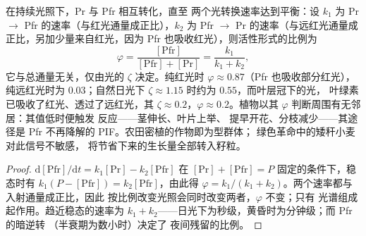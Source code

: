 \begin{proposition}[光敏色素光平衡]\label{prop:b3:plant-molecular-physiology:photoequilibrium}
在持续光照下，Pr 与 Pfr 相互转化，直至
两个光转换速率达到平衡：设 $k_{1}$ 为 Pr $\to$ Pfr
的速率（与红光通量成正比），$k_{2}$ 为 Pfr $\to$ Pr
的速率（与远红光通量成正比，另加少量来自红光，因为
Pfr 也吸收红光），则活性形式的比例为
\[
\varphi = \frac{[\text{Pfr}]}{[\text{Pfr}] + [\text{Pr}]} = \frac{k_{1}}{k_{1} + k_{2}},
\]
它与总通量无关，仅由光的\emph{}
$\zeta$ 决定。纯红光时 $\varphi \approx 0.87$（Pfr
也吸收部分红光），纯远红光时为 $0.03$；自然日光下 $\zeta \approx
1.15$ 时约为 $0.55$，而叶层冠下的光，
叶绿素已吸收了红光、透过了远红光，其
$\zeta \approx 0.2$，$\varphi \approx 0.2$。植物以其
$\varphi$ 判断周围有无邻居：其值低时便触发
\emph{}反应——茎伸长、叶片上举、
提早开花、分枝减少——其途径是 Pfr 不再降解的
PIF。农田密植的作物即为型群体；
绿色革命中的矮秆小麦对此信号不敏感，
将节省下来的生长量全部转入籽粒。
\end{proposition}
\begin{proof}
$\mathrm{d}[\text{Pfr}]/\mathrm{d}t = k_{1}[\text{Pr}] - k_{2}[\text{Pfr}]$
在 $[\text{Pr}] + [\text{Pfr}] = P$ 固定的条件下，稳态时有
$k_{1}(P - [\text{Pfr}]) = k_{2}[\text{Pfr}]$，由此得 $\varphi = k_{1}/
(k_{1} + k_{2})$。两个速率都与入射通量成正比，因此
按比例改变光照会同时改变两者，$\varphi$ 不变；只有
光谱组成起作用。趋近稳态的速率为
$k_{1} + k_{2}$——日光下为秒级，黄昏时为分钟级；而 Pfr 的暗逆转
（半衰期为数小时）决定了
夜间残留的比例。
\end{proof}

